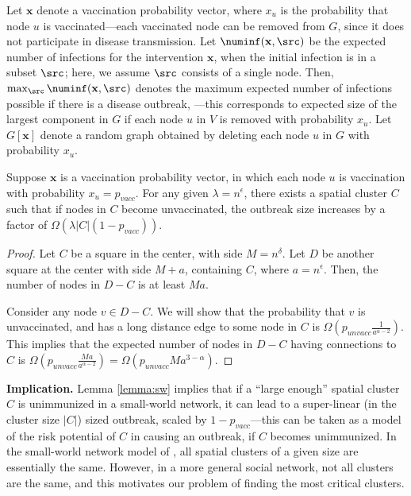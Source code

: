 Let $\mathbf{x}$ denote a vaccination probability vector, where $x_u$ is the probability that node $u$ is vaccinated---each vaccinated node can be removed from $G$, since it does not participate in disease transmission.
Let $\numinf(\mathbf{x}, \src)$ be the expected number of infections
for the intervention $\mathbf{x}$, when the initial infection is in a subset $\src$; here, we assume $\src$ consists of a single node. Then, $\max_{\src}\numinf(\mathbf{x},\src)$ denotes the maximum expected number of infections possible if there is a disease outbreak,
---this corresponds to expected size of the largest component in $G$ if each node $u$ in $V$ is removed with probability $x_u$.
Let $G[\mathbf{x}]$ denote a random graph obtained by deleting each node $u$ in $G$ with probability $x_u$.

\begin{lemma}
\label{lemma:sw}
Suppose $\mathbf{x}$ is a vaccination probability vector, in which each node $u$ is vaccination with probability
$x_u=p_{vacc}$.
For any given $\lambda=n^{\epsilon}$, there exists a spatial cluster $C$ such that if
nodes in $C$ become unvaccinated, the outbreak size increases by a factor of $\Omega(\lambda|C|(1-p_{vacc}))$.
\end{lemma}
\begin{proof}
Let $C$ be a square in the center, with side $M=n^{\delta}$.
Let $D$ be another square at the center with side $M+a$, containing $C$, where $a=n^{\epsilon}$.
Then, the number of nodes in $D-C$ is at least $Ma$.

Consider any node $v\in D-C$. We will show that the probability that $v$ is unvaccinated, and has a long distance edge
to some node in $C$ is $\Omega(p_{unvacc}\frac{1}{a^{\alpha-2}})$. This implies that the expected number of nodes in $D-C$
having connections to $C$ is $\Omega(p_{unvacc}\frac{Ma}{a^{\alpha-2}})=\Omega(p_{unvacc}Ma^{3-\alpha})$.
\end{proof}


\noindent
\textbf{Implication.} Lemma \ref{lemma:sw} implies that if a ``large enough'' spatial cluster $C$ is unimmunized in a small-world network, it can lead to a super-linear (in the cluster size $|C|$) sized outbreak, scaled by $1-p_{vacc}$---this can be taken as a model of the risk potential of $C$ in causing an outbreak, if $C$ becomes unimmunized. In the small-world network model of \cite{kleinberg+smallworld00}, all spatial clusters of a given size are essentially the same. However, in a more general social network, not all clusters are the same, and this motivates our problem of finding the most critical clusters.
